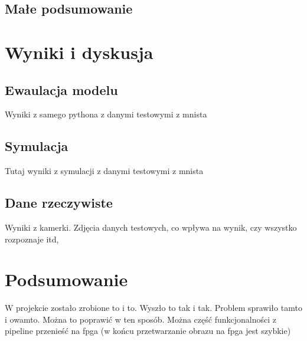 \documentclass[12pt, oneside]{article}
\begin{document}
\subsection{Małe podsumowanie}


\newpage
\section{Wyniki i dyskusja}

\subsection{Ewaulacja modelu}
Wyniki z samego pythona z danymi testowymi z mnista

\subsection{Symulacja}
Tutaj wyniki z symulacji z danymi testowymi z mnista

\subsection{Dane rzeczywiste}
Wyniki z kamerki. Zdjęcia danych testowych, co wpływa na wynik, czy wszystko
rozpoznaje itd,

\newpage
\section{Podsumowanie}
W projekcie zostało zrobione to i to. Wyszło to tak i tak. Problem sprawiło
tamto i owamto. Można to poprawić w ten sposób. Można część funkcjonalności
z pipeline przenieść na fpga (w końcu przetwarzanie obrazu na fpga jest szybkie)
\end{document}
